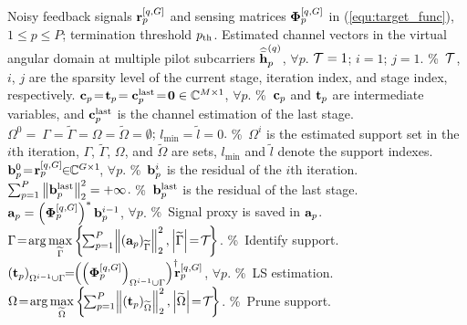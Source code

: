\documentclass[final]{IEEEtran}
\begin{document}
\begin{algorithm}[!tp]
{\small
\renewcommand{\algorithmicrequire}{\textbf{Input:}}
\renewcommand\algorithmicensure {\textbf{Output:} }
\caption{Proposed DSAMP Algorithm}
\label{alg:Framwork} %
\begin{algorithmic}[1]
\REQUIRE
 Noisy feedback signals ${\bf r}_p^{[q,G]}$ and sensing matrices ${\bf{\Phi}}_p^{[q,G]}$
 in (\ref{equ:target_func}), $1\le p \le P$; termination threshold $p_{\rm th}$.
\ENSURE
 Estimated channel vectors in the virtual angular domain at multiple pilot subcarriers
 $\widehat{\bar{\bf h}}_p^{(q)}$, $\forall p$.
\STATE ${\cal{T}} = 1$; $i = 1$; $j =1$. {\scriptsize \%~$\cal{T}$, $i$, $j$ are the sparsity
 level of the current stage, iteration index, and stage index, respectively.}
\STATE ${\bf c}_p\!=\!{\bf t}_p\! ={\bf c}_p^{\rm{last}}\!=\!{\bf{0}}\in \mathbb{C}^{M\times 1}$, $\forall p$.
 {\scriptsize \%~${\bf c}_p$ and ${\bf t}_p$ are intermediate variables, and ${\bf c}_p^{\rm{last}}$
 is the channel estimation of the last stage.}
\STATE $\Omega^0\!\!=\!\!\! \ {\Gamma}\!=\! \widetilde{\Gamma}\!=\!\Omega\!=\!\widetilde{\Omega}\!=\!
 \emptyset$; $l_{\text{min}}\!=\!\widetilde l\!=\!0$. {\scriptsize \%~$\Omega^i$ is the estimated
 support set in the $i$th iteration, $\Gamma$, $\widetilde{\Gamma}$, $\Omega$, and $\widetilde{\Omega}$
 are sets, $l_{\text{min}}$ and $\widetilde l$ denote the support indexes.}
\STATE ${\bf b}^0_p \!=\!{\bf r}_p^{[q,G]}\!\!\in \!\!\mathbb{C}^{G\times 1}\!$, $\forall p$.
 {\scriptsize \%~${\bf b}^i_p$ is the residual of the $i$th iteration.}
\STATE $\sum\nolimits_{p = 1}^P {\left\| {{\bf{b}}_p^{{\rm{last}}}} \right\|_2^2}=+\infty$.
 {\scriptsize \%~${{\bf{b}}_p^{{\rm{last}}}}$ is the residual of the last stage.}
\REPEAT
\STATE ${\bf a}_p=\left( {\bf{\Phi}}_p^{[q,G]} \right)^{*} {\bf b}^{i-1}_p$, $\forall p$.
 {\scriptsize \%~Signal proxy is saved in ${\bf a}_p$.}
\STATE $\Gamma \! = \!\arg \max\limits_{\widetilde{\Gamma}} \left\{ \! \sum\nolimits_{p=1}^{P} \!
 \left\| \left( {\bf a}_p \right)_{\widetilde{\Gamma}} \right\|_2^2 ,\left| \widetilde{\Gamma}
 \right| \! = \! {\cal{T}} \! \right\}$. {\scriptsize \%~Identify support.}
\STATE $\left( {\bf t}_p \right)_{ \Omega^{i-1} \cup \Gamma} \!\!=\!\!
 \left(\left( {\bf{\Phi}}_p^{[q,G]} \right)_{ \Omega^{i-1} \cup \Gamma}\right)^{\dag}
\!\!\! {\bf r}_p^{[q,G]}$, $\forall p$. {\scriptsize \%~LS estimation.}
\STATE $\Omega \! = \!\arg \max\limits_{\widetilde{\Omega}} \left\{ \! \sum\nolimits_{p=1}^{P} \!
 \left\| \left( {\bf t}_p \right)_{\widetilde{\Omega}} \right\|_2^2 ,
 \left| \widetilde{\Omega} \right| \! = \! {\cal T} \! \right\}$. {\scriptsize \%~Prune support.}

\end{algorithmic}}
\end{algorithm}
\end{document}
